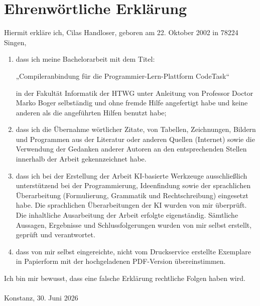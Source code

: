 \chapter*{Ehrenwörtliche Erklärung}
Hiermit erkläre ich, Cilas Handloser, geboren am 22. Oktober 2002 in 78224 Singen,

\begin{enumerate}
	\item dass ich meine Bachelorarbeit mit dem Titel:
	
	„Compileranbindung für die Programmier-Lern-Plattform CodeTask“
	
	in der Fakultät Informatik der HTWG unter Anleitung von Professor Doctor Marko Boger selbständig und ohne fremde Hilfe angefertigt habe und keine anderen als die angeführten Hilfen benutzt habe;
	
	\item dass ich die Übernahme wörtlicher Zitate, von Tabellen, Zeichnungen, Bildern und Programmen aus der Literatur oder anderen Quellen (Internet) sowie die Verwendung der Gedanken anderer Autoren an den entsprechenden Stellen innerhalb der Arbeit gekennzeichnet habe.
	
	\item dass ich bei der Erstellung der Arbeit KI-basierte Werkzeuge ausschließlich unterstützend bei der Programmierung, Ideenfindung sowie der sprachlichen Überarbeitung (Formulierung, Grammatik und Rechtschreibung) eingesetzt habe. Die sprachlichen Überarbeitungen der KI wurden von mir überprüft. Die inhaltliche Ausarbeitung der Arbeit erfolgte eigenständig. Sämtliche Aussagen, Ergebnisse und Schlussfolgerungen wurden von mir selbst erstellt, geprüft und verantwortet.
	
	\item dass von mir selbst eingereichte, nicht vom Druckservice erstellte Exemplare in Papierform mit der hochgeladenen PDF-Version übereinstimmen.
\end{enumerate}

Ich bin mir bewusst, dass eine falsche Erklärung rechtliche Folgen haben wird. \\ \\


Konstanz, 30. Juni 2026		